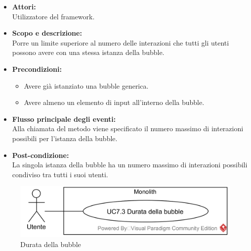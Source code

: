 \begin{itemize}
	\item \textbf{Attori:}
	\\Utilizzatore del framework.
	\item \textbf{Scopo e descrizione:} 
	\\Porre un limite superiore al numero delle interazioni che tutti gli utenti possono avere con una stessa istanza della bubble.
	\item \textbf{Precondizioni:}
	\begin{itemize}
		\item Avere già istanziato una bubble generica.
		\item Avere almeno un elemento di input all'interno della bubble.
	\end{itemize}
	\item \textbf{Flusso principale degli eventi:}
	\\Alla chiamata del metodo viene specificato il numero massimo di interazioni possibili per l'istanza della bubble.
	\item \textbf{Post-condizione:}
	\\La singola istanza della bubble ha un numero massimo di interazioni possibili condiviso tra tutti i suoi utenti. 
\end{itemize}

\begin{samepage}
\nopagebreak
\begin{figure}[H]
	\centering
	\includegraphics[width=15cm]{../../documenti/AnalisiDeiRequisiti/Diagrammi_img/usecase/uc1_13.png}
	\caption{\UCFCaption{} Durata della bubble}
\end{figure}
\end{samepage}

